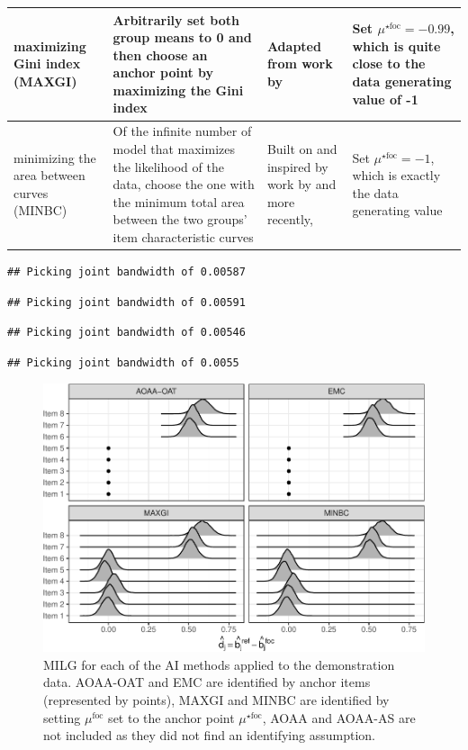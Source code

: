 \documentclass[
  11pt,
]{article}
\begin{document}
\begin{table}[H]
\begin{tabular}{|p{3cm}|p{4cm}|p{3cm}|p{3cm}|}
maximizing Gini index (MAXGI) & Arbitrarily set both group means to 0 and then choose an anchor point by maximizing the Gini index & Adapted from work by \cite{strobl2018anchor} & Set $\mu^{\star\text{foc}} = -0.99$, which is quite close to the data generating value of -1 \\\hline

minimizing the area between curves (MINBC) & Of the infinite number of model that maximizes the likelihood of the data, choose the one with the minimum total area between the two groups' item characteristic curves & Built on and inspired by work by \cite{raju1988area} and more recently, \cite{chalmers2016might} & Set $\mu^{\star\text{foc}} = -1$, which is exactly the data generating value\\

\bottomrule
\end{tabular}
\label{table:allmethods}
\end{table}

\begin{verbatim}
## Picking joint bandwidth of 0.00587
\end{verbatim}

\begin{verbatim}
## Picking joint bandwidth of 0.00591
\end{verbatim}

\begin{verbatim}
## Picking joint bandwidth of 0.00546
\end{verbatim}

\begin{verbatim}
## Picking joint bandwidth of 0.0055
\end{verbatim}

\begin{figure}[H]

{\centering \includegraphics[width=0.7\linewidth]{paper_files/figure-latex/allmethodsfig-1} 

}

\caption{MILG for each of the AI methods applied to the demonstration data. AOAA-OAT and EMC are identified by anchor items (represented by points), MAXGI and MINBC are identified by setting $\mu^{\text{foc}}$ set to the anchor point $\mu^{\star\text{foc}}$, AOAA and AOAA-AS are not included as they did not find an identifying assumption.}\label{fig:allmethodsfig}
\end{figure}
\end{document}
